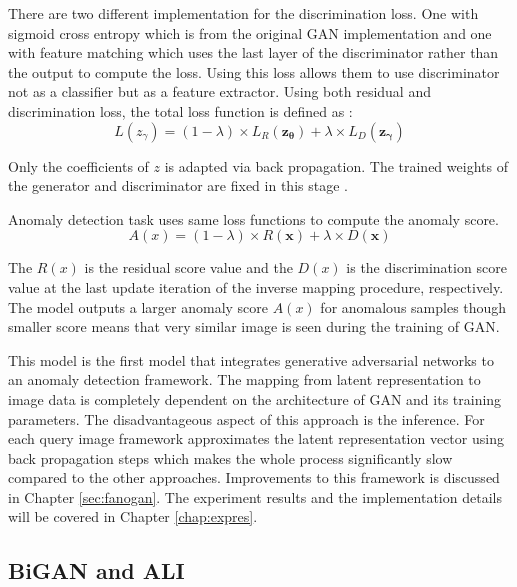 There are two different implementation for the discrimination loss. One with sigmoid cross entropy
which is from the original GAN implementation \cite{Goodfellow:2014:GAN:2969033.2969125} and one
with feature matching \cite{fm} which uses the last layer of the discriminator rather than the
output to compute the loss. Using this loss allows them to use discriminator not as a classifier but
as a feature extractor. Using both residual and discrimination loss, the total loss function is
defined as :
$$L(z_{\gamma}) = (1 - \lambda ) \times L_{R}(\boldsymbol{z_{\theta}}) + \lambda \times
L_{D}(\boldsymbol{z_{\gamma}})$$

Only the coefficients of $z$ is adapted via back propagation. The trained weights of the generator
and discriminator are fixed in this stage \cite{Schlegl2017UnsupervisedAD}.

Anomaly detection task uses same loss functions to compute the anomaly score. 
$$A(x) = (1 - \lambda ) \times R(\boldsymbol{x}) + \lambda \times D(\boldsymbol{x}) $$

The $R(x)$ is the residual score value and the $D(x)$ is the discrimination score value at the last
update iteration of the inverse mapping procedure, respectively. The model outputs a larger anomaly
score $A(x)$ for anomalous samples though smaller score means that very similar image is seen during
the training of GAN. 

This model is the first model that integrates generative adversarial networks to an anomaly
detection framework. The mapping from latent representation to image data is completely dependent on
the architecture of GAN and its training parameters. The disadvantageous aspect of this approach
is the inference. For each query image framework approximates the latent representation vector using
back propagation steps which makes the whole process significantly slow compared to the other
approaches. Improvements to this framework is discussed in  Chapter
\ref{sec:fanogan}. The experiment results and the implementation details will be covered in
Chapter \ref{chap:expres}.

\subsection{BiGAN and ALI}
\label{sec:bigan}

